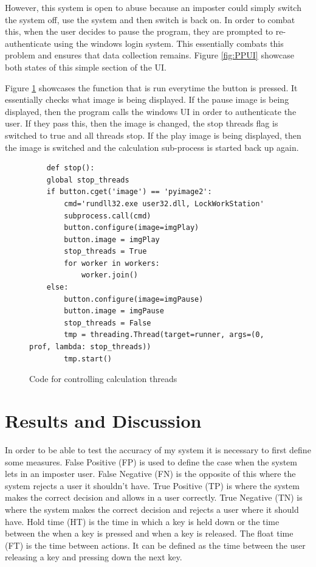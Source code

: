 \documentclass[10pt,a4paper]{report}
\begin{document}
However, this system is open to abuse because an imposter could simply switch the system off, use the system and then switch is back on. In order to combat this, when the user decides to pause the program, they are prompted to re-authenticate using the windows login system. This essentially combats this problem and ensures that data collection remains. Figure \ref{fig:PPUI} showcase both states of this simple section of the UI. 

Figure \ref{fig:stoppingThread} showcases the function that is run everytime the button is pressed. It essentially checks what image is being displayed. If the pause image is being displayed, then the program calls the windows UI in order to authenticate the user. If they pass this, then the image is changed, the stop threads flag is switched to true and all threads stop. If the play image is being displayed, then the image is switched and the calculation sub-process is started back up again.

\begin{figure}
	\begin{lstlisting}
	def stop():
    global stop_threads
    if button.cget('image') == 'pyimage2':
        cmd='rundll32.exe user32.dll, LockWorkStation'
        subprocess.call(cmd)
        button.configure(image=imgPlay)
        button.image = imgPlay
        stop_threads = True
        for worker in workers:
            worker.join()
    else:
        button.configure(image=imgPause)
        button.image = imgPause
        stop_threads = False
        tmp = threading.Thread(target=runner, args=(0, prof, lambda: stop_threads))
        tmp.start()
        \end{lstlisting}
        \caption{Code for controlling calculation threads}
        \label{fig:stoppingThread}
\end{figure}

\chapter{Results and Discussion}

In order to be able to test the accuracy of my system it is necessary to first define some measures. False Positive (FP) is used to define the case when the system lets in an imposter user. False Negative (FN) is the opposite of this where the system rejects a user it shouldn't have. True Positive (TP) is where the system makes the correct decision and allows in a user correctly. True Negative (TN) is where the system makes the correct decision and rejects a user where it should have. Hold time (HT) is the time in which a key is held down or the time between the when a key is pressed and when a key is released. The float time (FT) is the time between actions. It can be defined as the time between the user releasing a key and pressing down the next key.
\end{document}
